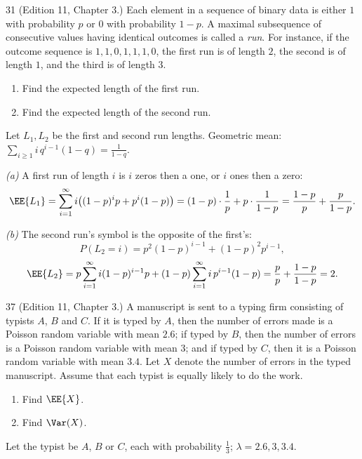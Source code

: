 \documentclass[11pt]{article}
\begin{document}
\begin{problem}{31}
  (Edition 11, Chapter 3.) Each element in a sequence of binary data is either
  $1$ with probability $p$ or $0$ with probability $1 - p$. A maximal
  subsequence of consecutive values having identical outcomes is called a
  \emph{run}. For instance, if the outcome sequence is $1,1,0,1,1,1,0$, the
  first run is of length $2$, the second is of length $1$, and the third is of
  length $3$.
  \begin{enumerate}
    \item[(a)] Find the expected length of the first run.
    \item[(b)] Find the expected length of the second run.
  \end{enumerate}
\end{problem}
Let $L_1, L_2$ be the first and second run lengths. Geometric mean: $\sum_{i\ge1} i\,q^{i-1}(1-q) = \frac{1}{1-q}$.

\emph{(a)} A first run of length $i$ is $i$ zeros then a one, or $i$ ones then a zero:
\[
  \EE{L_1} = \sum_{i=1}^{\infty} i\big((1-p)^i p + p^i(1-p)\big)
           = (1-p)\cdot\frac{1}{p} + p\cdot\frac{1}{1-p}
           = \frac{1-p}{p} + \frac{p}{1-p}.
\]

\emph{(b)} The second run's symbol is the opposite of the first's:
\[
  P(L_2 = i) = p^2 (1-p)^{i-1} + (1-p)^2 p^{i-1},
\]
\[
  \EE{L_2} = p\sum_{i=1}^{\infty} i(1-p)^{i-1} p + (1-p)\sum_{i=1}^{\infty} i\,p^{i-1}(1-p)
           = \frac{p}{p} + \frac{1-p}{1-p} = 2.
\]

\begin{problem}{37}
  (Edition 11, Chapter 3.) A manuscript is sent to a typing firm consisting of
  typists $A$, $B$ and $C$. If it is typed by $A$, then the number of errors
  made is a Poisson random variable with mean $2.6$; if typed by $B$, then the
  number of errors is a Poisson random variable with mean $3$; and if typed by
  $C$, then it is a Poisson random variable with mean $3.4$. Let $X$ denote the
  number of errors in the typed manuscript. Assume that each typist is equally
  likely to do the work.
  \begin{enumerate}
    \item[(a)] Find $\EE{X}$.
    \item[(b)] Find $\Var(X)$.
  \end{enumerate}
\end{problem}
Let the typist be $A$, $B$ or $C$, each with probability $\tfrac13$; $\lambda = 2.6, 3, 3.4$.
\end{document}
